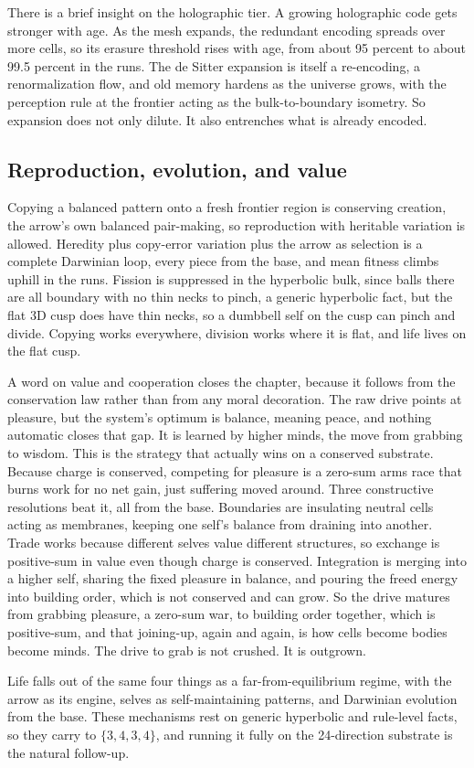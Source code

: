 There is a brief insight on the holographic tier. A growing holographic code gets stronger with age. As the mesh expands, the redundant encoding spreads over more cells, so its erasure threshold rises with age, from about 95 percent to about 99.5 percent in the runs. The de Sitter expansion is itself a re-encoding, a renormalization flow, and old memory hardens as the universe grows, with the perception rule at the frontier acting as the bulk-to-boundary isometry. So expansion does not only dilute. It also entrenches what is already encoded.

\subsection{Reproduction, evolution, and value}

Copying a balanced pattern onto a fresh frontier region is conserving creation, the arrow's own balanced pair-making, so reproduction with heritable variation is allowed. Heredity plus copy-error variation plus the arrow as selection is a complete Darwinian loop, every piece from the base, and mean fitness climbs uphill in the runs. Fission is suppressed in the hyperbolic bulk, since balls there are all boundary with no thin necks to pinch, a generic hyperbolic fact, but the flat 3D cusp does have thin necks, so a dumbbell self on the cusp can pinch and divide. Copying works everywhere, division works where it is flat, and life lives on the flat cusp.

A word on value and cooperation closes the chapter, because it follows from the conservation law rather than from any moral decoration. The raw drive points at pleasure, but the system's optimum is balance, meaning peace, and nothing automatic closes that gap. It is learned by higher minds, the move from grabbing to wisdom. This is the strategy that actually wins on a conserved substrate. Because charge is conserved, competing for pleasure is a zero-sum arms race that burns work for no net gain, just suffering moved around. Three constructive resolutions beat it, all from the base. Boundaries are insulating neutral cells acting as membranes, keeping one self's balance from draining into another. Trade works because different selves value different structures, so exchange is positive-sum in value even though charge is conserved. Integration is merging into a higher self, sharing the fixed pleasure in balance, and pouring the freed energy into building order, which is not conserved and can grow. So the drive matures from grabbing pleasure, a zero-sum war, to building order together, which is positive-sum, and that joining-up, again and again, is how cells become bodies become minds. The drive to grab is not crushed. It is outgrown.

Life falls out of the same four things as a far-from-equilibrium regime, with the arrow as its engine, selves as self-maintaining patterns, and Darwinian evolution from the base. These mechanisms rest on generic hyperbolic and rule-level facts, so they carry to $\{3,4,3,4\}$, and running it fully on the 24-direction substrate is the natural follow-up.
